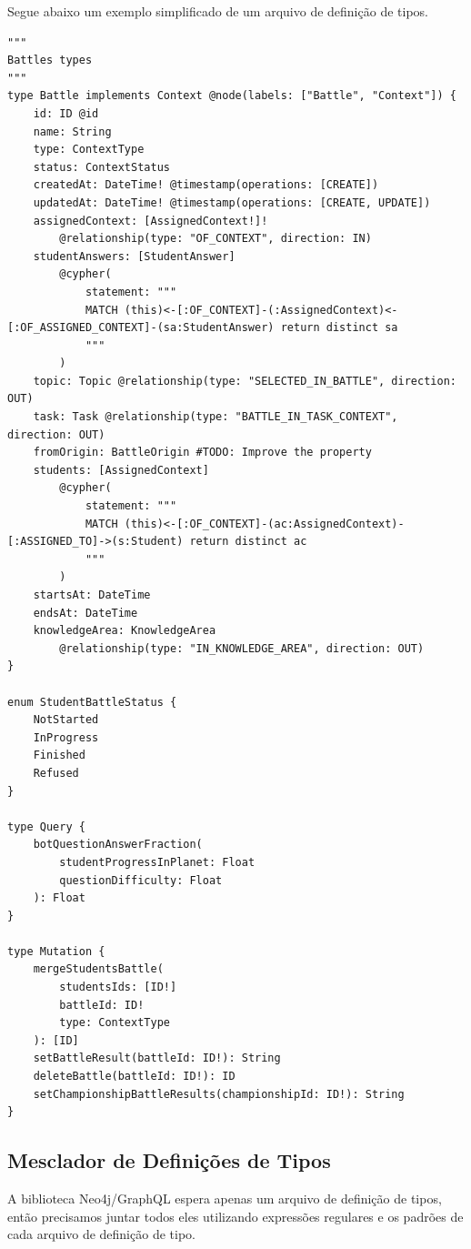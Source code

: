 Segue abaixo um exemplo simplificado de um arquivo de definição de tipos.
\begin{lstlisting}
"""
Battles types
"""
type Battle implements Context @node(labels: ["Battle", "Context"]) {
	id: ID @id
	name: String
	type: ContextType
	status: ContextStatus
	createdAt: DateTime! @timestamp(operations: [CREATE])
	updatedAt: DateTime! @timestamp(operations: [CREATE, UPDATE])
	assignedContext: [AssignedContext!]!
		@relationship(type: "OF_CONTEXT", direction: IN)
	studentAnswers: [StudentAnswer]
		@cypher(
			statement: """
			MATCH (this)<-[:OF_CONTEXT]-(:AssignedContext)<-[:OF_ASSIGNED_CONTEXT]-(sa:StudentAnswer) return distinct sa
			"""
		)
	topic: Topic @relationship(type: "SELECTED_IN_BATTLE", direction: OUT)
	task: Task @relationship(type: "BATTLE_IN_TASK_CONTEXT", direction: OUT)
	fromOrigin: BattleOrigin #TODO: Improve the property
	students: [AssignedContext]
		@cypher(
			statement: """
			MATCH (this)<-[:OF_CONTEXT]-(ac:AssignedContext)-[:ASSIGNED_TO]->(s:Student) return distinct ac
			"""
		)
	startsAt: DateTime
	endsAt: DateTime
	knowledgeArea: KnowledgeArea
		@relationship(type: "IN_KNOWLEDGE_AREA", direction: OUT)
}

enum StudentBattleStatus {
	NotStarted
	InProgress
	Finished
	Refused
}

type Query {
	botQuestionAnswerFraction(
		studentProgressInPlanet: Float
		questionDifficulty: Float
	): Float
}

type Mutation {
	mergeStudentsBattle(
		studentsIds: [ID!]
		battleId: ID!
		type: ContextType
	): [ID]
	setBattleResult(battleId: ID!): String
	deleteBattle(battleId: ID!): ID
	setChampionshipBattleResults(championshipId: ID!): String
}
\end{lstlisting}

\subsection{Mesclador de Definições de Tipos}
A biblioteca Neo4j/GraphQL espera apenas um arquivo de definição de tipos, então precisamos juntar todos eles utilizando expressões regulares e os padrões de cada arquivo de definição de tipo.

